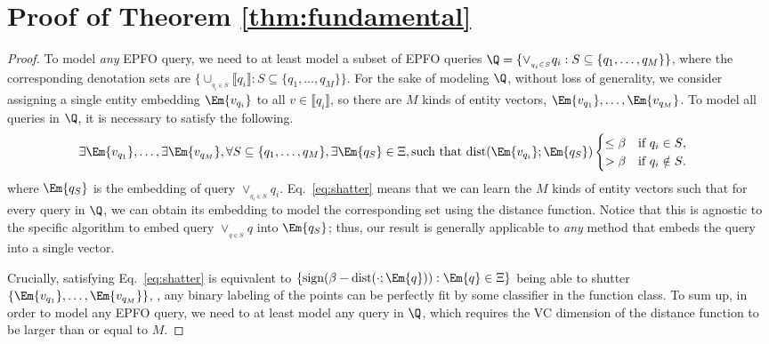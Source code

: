 
\section{Proof of Theorem \ref{thm:fundamental}}
\label{app:proof_fundamental}


\begin{proof}
To model \emph{any} EPFO query, we need to at least model a subset of EPFO queries
$\Q = \{ \vee_{_{q_i \in S}} q_i: S \subseteq \{q_1, \ldots, q_M\}\}$, where the corresponding denotation sets are $\{ \cup_{_{q_i \in S}} \llbracket q_i\rrbracket: S \subseteq \{q_1, \ldots, q_M\}\}$.
For the sake of modeling $\Q$, without loss of generality, we consider assigning a single entity embedding $\Em{v_{q_i}}$ to all $v \in \llbracket q_i\rrbracket$, so there are $M$ kinds of entity vectors, $\Em{v_{q_1}}, \ldots, \Em{v_{q_M}}$.
To model all queries in $\Q$, it is necessary to satisfy the following.
\begin{align}
\label{eq:shatter}
\exists \Em{v_{q_1}}, \ldots, \exists\Em{v_{q_M}}, \forall S \subseteq \{q_1, \ldots, q_M\}, \exists \Em{q_S} \in \Xi, \text{such that } {\rm dist}(\Em{v_{q_i}};\Em{q_S}) 
\begin{cases} 
\leq \beta \ \ \text{ if $q_i \in S$,} \\
> \beta \ \ \text{ if $q_i \notin S$}.
\end{cases}
\end{align}
where $\Em{q_S}$ is the embedding of query $\vee_{_{q_i \in S}} q_i$. 
Eq.~\ref{eq:shatter} means that we can learn the $M$ kinds of entity vectors such that for every query in $\Q$, we can obtain its embedding to model the corresponding set using the distance function.
Notice that this is agnostic to the specific algorithm to embed query $\vee_{_{q \in S}}q$ into $\Em{q_S}$; thus, our result is generally applicable to \emph{any} method that embeds the query into a single vector.

Crucially, satisfying Eq.~\ref{eq:shatter} is equivalent to $\{{\rm sign}(\beta - {\rm dist}(\cdot; \Em{q})): \Em{q} \in \Xi\}$ being able to shutter $\{\Em{v_{q_1}}, \ldots , \Em{v_{q_M}}\}$, \ie, any binary labeling of the points can be perfectly fit by some classifier in the function class. To sum up, in order to model any EPFO query, we need to at least model any query in $\Q$, which requires the VC dimension of the distance function to be larger than or equal to $M$.
\end{proof}

